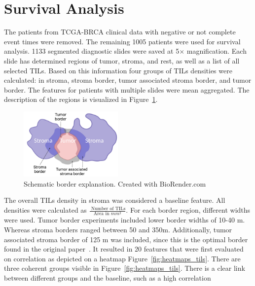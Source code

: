 \section{Survival Analysis}
The patients from TCGA-BRCA clinical data with negative or not complete event times were removed. The remaining
1005 patients were used for survival analysis.
1133 segmented diagnostic slides were saved at 5$\times$ magnification. Each slide has determined regions of tumor, stroma,
and rest, as well as a list of all selected TILs. Based on this information four groups of TILs
densities were calculated: in stroma, stroma border, tumor associated stroma border,
and tumor border. The features for patients with multiple slides were mean aggregated.
The description of the regions is visualized in Figure~\ref*{fig:borders}.
\begin{figure}
    \centering
    \includegraphics[width=0.45\textwidth]{figures/survival/tils_scheme.png} 
    \caption{Schematic border explanation. Created with BioRender.com}
    \label{fig:borders} 
\end{figure}
The overall TILs density in stroma was considered a baseline feature.
All densities were calculated as $\frac{\textrm{ Number of TILs}}{\textrm{Area in } mm^2}$.
For each border region, different widths were used. Tumor border experiments included
lower border widths of 10-40 \textmu m. Whereas stroma borders ranged between 50
and 350\textmu m.
Additionally, tumor associated stroma border of 125 \textmu m was included, since this is
the optimal border found in the original paper~\cite{thagaard2021automated}.
It resulted in 20 features
that were first evaluated on correlation as depicted on a heatmap Figure~\ref{fig:heatmaps_tils}.
There are three coherent groups visible in Figure~\ref{fig:heatmaps_tils}.
There is a clear link between different groups and the baseline, such as a high correlation
